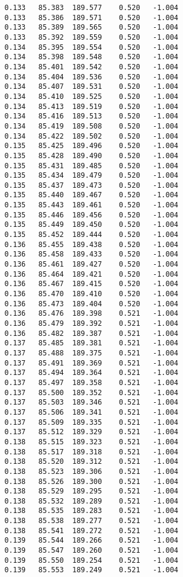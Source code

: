 \begin{verbatim}
   0.133   85.383  189.577    0.520   -1.004
   0.133   85.386  189.571    0.520   -1.004
   0.133   85.389  189.565    0.520   -1.004
   0.133   85.392  189.559    0.520   -1.004
   0.134   85.395  189.554    0.520   -1.004
   0.134   85.398  189.548    0.520   -1.004
   0.134   85.401  189.542    0.520   -1.004
   0.134   85.404  189.536    0.520   -1.004
   0.134   85.407  189.531    0.520   -1.004
   0.134   85.410  189.525    0.520   -1.004
   0.134   85.413  189.519    0.520   -1.004
   0.134   85.416  189.513    0.520   -1.004
   0.134   85.419  189.508    0.520   -1.004
   0.134   85.422  189.502    0.520   -1.004
   0.135   85.425  189.496    0.520   -1.004
   0.135   85.428  189.490    0.520   -1.004
   0.135   85.431  189.485    0.520   -1.004
   0.135   85.434  189.479    0.520   -1.004
   0.135   85.437  189.473    0.520   -1.004
   0.135   85.440  189.467    0.520   -1.004
   0.135   85.443  189.461    0.520   -1.004
   0.135   85.446  189.456    0.520   -1.004
   0.135   85.449  189.450    0.520   -1.004
   0.135   85.452  189.444    0.520   -1.004
   0.136   85.455  189.438    0.520   -1.004
   0.136   85.458  189.433    0.520   -1.004
   0.136   85.461  189.427    0.520   -1.004
   0.136   85.464  189.421    0.520   -1.004
   0.136   85.467  189.415    0.520   -1.004
   0.136   85.470  189.410    0.520   -1.004
   0.136   85.473  189.404    0.520   -1.004
   0.136   85.476  189.398    0.521   -1.004
   0.136   85.479  189.392    0.521   -1.004
   0.136   85.482  189.387    0.521   -1.004
   0.137   85.485  189.381    0.521   -1.004
   0.137   85.488  189.375    0.521   -1.004
   0.137   85.491  189.369    0.521   -1.004
   0.137   85.494  189.364    0.521   -1.004
   0.137   85.497  189.358    0.521   -1.004
   0.137   85.500  189.352    0.521   -1.004
   0.137   85.503  189.346    0.521   -1.004
   0.137   85.506  189.341    0.521   -1.004
   0.137   85.509  189.335    0.521   -1.004
   0.137   85.512  189.329    0.521   -1.004
   0.138   85.515  189.323    0.521   -1.004
   0.138   85.517  189.318    0.521   -1.004
   0.138   85.520  189.312    0.521   -1.004
   0.138   85.523  189.306    0.521   -1.004
   0.138   85.526  189.300    0.521   -1.004
   0.138   85.529  189.295    0.521   -1.004
   0.138   85.532  189.289    0.521   -1.004
   0.138   85.535  189.283    0.521   -1.004
   0.138   85.538  189.277    0.521   -1.004
   0.138   85.541  189.272    0.521   -1.004
   0.139   85.544  189.266    0.521   -1.004
   0.139   85.547  189.260    0.521   -1.004
   0.139   85.550  189.254    0.521   -1.004
   0.139   85.553  189.249    0.521   -1.004

\end{verbatim}
